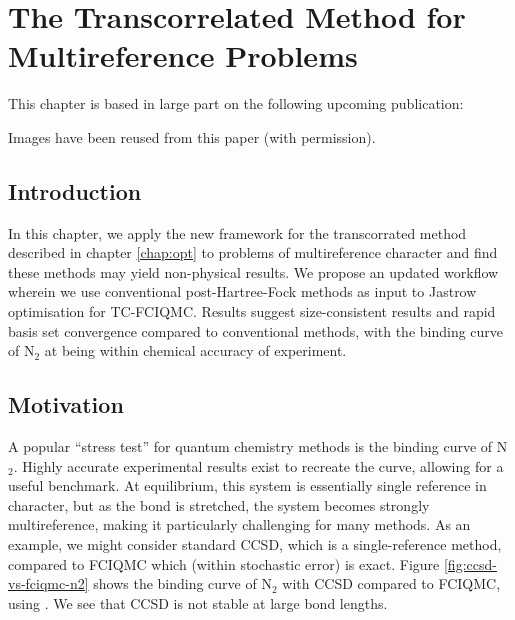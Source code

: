\chapter{The Transcorrelated Method for Multireference Problems}
\label{chap:binding}

This chapter is based in large part on the following upcoming publication:\\

Images have been reused from this paper (with permission).

\section{Introduction}

In this chapter, we apply the new framework for the transcorrated method described in chapter \ref{chap:opt} to problems of multireference character and find these methods may yield non-physical results. We propose an updated workflow wherein we use conventional post-Hartree-Fock methods as input to Jastrow optimisation for TC-FCIQMC. Results suggest size-consistent results and rapid basis set convergence compared to conventional methods, with the binding curve of N$_2$ at \avtz being within chemical accuracy of experiment.

\section{Motivation}

A popular ``stress test'' for quantum chemistry methods is the binding curve of N$_2$. Highly accurate experimental results\supercite{leroyAccurate2006} exist to recreate the curve, allowing for a useful benchmark. At equilibrium, this system is essentially single reference in character, but as the bond is stretched, the system becomes strongly multireference, making it particularly challenging for many methods. As an example, we might consider standard \gls{CCSD}, which is a single-reference method, compared to FCIQMC which (within stochastic error) is exact. Figure \ref{fig:ccsd-vs-fciqmc-n2} shows the binding curve of N$_2$ with CCSD compared to FCIQMC, using \avtz. We see that CCSD is not stable at large bond lengths.

